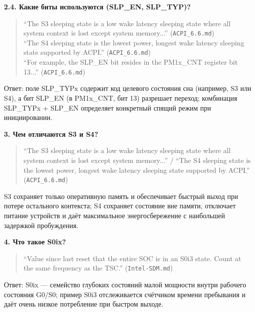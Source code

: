 \documentclass[a4paper,12pt]{article}
\begin{document}
\textbf{2.4. Какие биты используются (SLP\_EN, SLP\_TYP)?} 
\begin{quote}
``The S3 sleeping state is a low wake latency sleeping state where all system context is lost except system memory...'' (\texttt{ACPI\_6.6.md}) \\
``The S4 sleeping state is the lowest power, longest wake latency sleeping state supported by ACPI.'' (\texttt{ACPI\_6.6.md}) \\
``For example, the SLP\_EN bit resides in the PM1x\_CNT register bit 13...'' (\texttt{ACPI\_6.6.md})
\end{quote}
Ответ: поле SLP\_TYPx содержит код целевого состояния сна (например, S3 или S4), а бит SLP\_EN (в PM1x\_CNT, бит 13) разрешает переход; комбинация SLP\_TYPx + SLP\_EN определяет конкретный спящий режим при инициировании.

\textbf{3. Чем отличаются S3 и S4?} 
\begin{quote}
``The S3 sleeping state is a low wake latency sleeping state where all system context is lost except system memory...'' / ``The S4 sleeping state is the lowest power, longest wake latency sleeping state supported by ACPI.'' (\texttt{ACPI\_6.6.md})
\end{quote}
S3 сохраняет только оперативную память и обеспечивает быстрый выход при потере остального контекста; S4 сохраняет состояние вне памяти, отключает питание устройств и даёт максимальное энергосбережение с наибольшей задержкой пробуждения.

\textbf{4. Что такое S0ix?} 
\begin{quote}
``Value since last reset that the entire SOC is in an S0i3 state. Count at the same frequency as the TSC.'' (\texttt{Intel-SDM.md})
\end{quote}
Ответ: S0ix — семейство глубоких состояний малой мощности внутри рабочего состояния G0/S0; пример S0i3 отслеживается счётчиком времени пребывания и даёт очень низкое потребление при быстром выходе.
\end{document}
